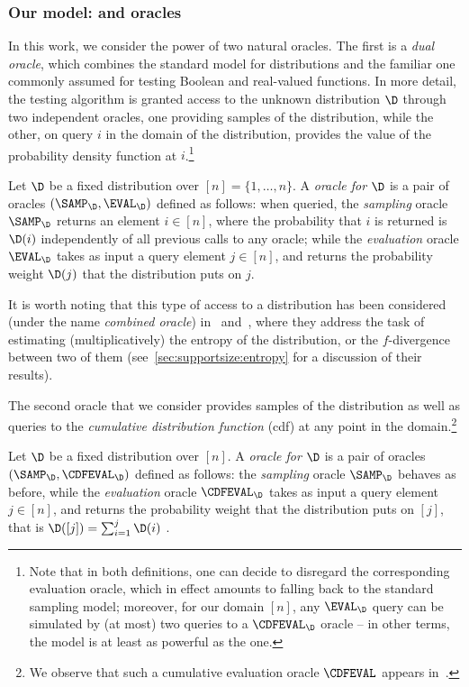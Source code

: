   \subsubsection{Our model: \pdfsamp and \cdfsamp oracles}  
  In this work, we consider the power of two natural oracles.
The first is a \emph{dual oracle}, which combines the standard model for distributions and the familiar one commonly assumed for testing Boolean and real-valued functions. In more detail, the testing algorithm is granted access to the unknown distribution $\D$ through two independent oracles, one providing samples of the distribution, while the other, on query $i$ in the domain of the distribution, provides the value of the probability
density function at $i$.\footnote{Note that in both definitions, one can decide to disregard the corresponding evaluation oracle, which in effect amounts to falling back to the standard sampling model; moreover, for our domain $[n]$, any $\EVAL_\D$ query can be simulated by (at most) two queries to a $\CDFEVAL_\D$ oracle -- in other terms, the \cdfsamp model is at least as powerful as the \pdfsamp one.}
    
    \begin{definition}
    Let $\D$ be a fixed distribution over $[n]=\{1,\dots,n\}$. A \emph{\pdfsamp oracle for $\D$} is a pair of oracles $(\SAMP_\D, \EVAL_\D)$ defined as follows: when queried, the \emph{sampling} oracle $\SAMP_\D$ returns an element $i\in[n]$, where the probability that $i$ is returned is $\D(i)$ independently of all previous calls to any oracle; while the \emph{evaluation} oracle $\EVAL_\D$ takes as input a query element $j\in[n]$, and returns the probability weight $\D(j)$ that the distribution puts on $j$.
    \end{definition}
    It is worth noting that this type of \pdfsamp access to a distribution has been considered (under the name \emph{combined oracle}) in~\cite{BDKR:05} and~\cite{GMV:05}, where they address the task of estimating (multiplicatively) the entropy of the distribution, or the $f$-divergence between two of them (see~\cref{sec:supportsize:entropy} for a discussion of their results).\medskip
    
    The second oracle that we consider provides samples of the distribution as well as queries to the \emph{cumulative distribution function} (cdf) at any point in the domain.\footnote{We observe that such a cumulative evaluation oracle $\CDFEVAL$ appears in~\cite[Section 8]{BKR:04}.}
    \begin{definition}
    Let $\D$ be a fixed distribution over $[n]$. A \emph{\cdfsamp oracle for $\D$} is a pair of oracles $(\SAMP_\D, \CDFEVAL_\D)$ defined as follows: the \emph{sampling} oracle $\SAMP_\D$ behaves as before, while the \emph{evaluation} oracle $\CDFEVAL_\D$ takes as input a query element $j\in[n]$, and returns the probability weight that the distribution puts on $[j]$, that is
    $\D([j])=\sum_{i=1}^j \D(i)$ .
    \end{definition}    
    

